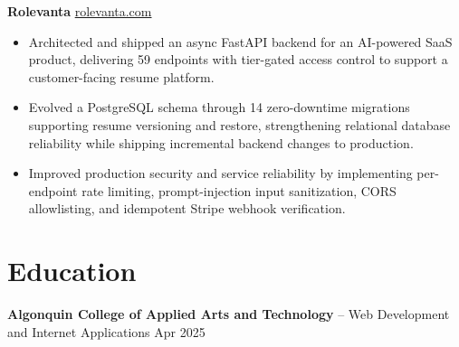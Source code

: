 \documentclass[11pt]{article}       %
\begin{document}
\textbf{Rolevanta} \hfill \href{https://rolevanta.com}{rolevanta.com} \\
\vspace{-9pt}
\begin{itemize}
  \item Architected and shipped an async FastAPI backend for an AI-powered SaaS product, delivering 59 endpoints with tier-gated access control to support a customer-facing resume platform.
  \item Evolved a PostgreSQL schema through 14 zero-downtime migrations supporting resume versioning and restore, strengthening relational database reliability while shipping incremental backend changes to production.
  \item Improved production security and service reliability by implementing per-endpoint rate limiting, prompt-injection input sanitization, CORS allowlisting, and idempotent Stripe webhook verification.
\end{itemize}





\section*{Education}
\textbf{Algonquin College of Applied Arts and Technology} -- Web Development and Internet Applications
\hfill Apr 2025 \\
\end{document}
